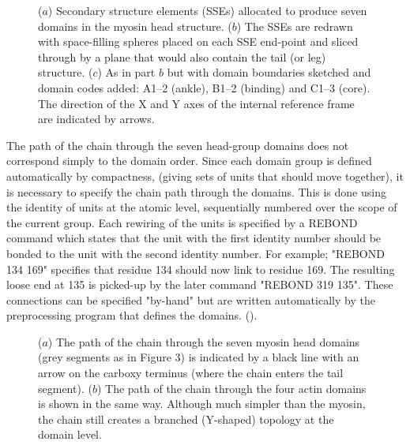 \begin{figure}
\centering
{}
\caption{
\label{Fig:secdoms}
($a$) Secondary structure elements (SSEs) allocated to produce seven domains
in the myosin head structure.
($b$) The SSEs are redrawn with space-filling
spheres placed on each SSE end-point and sliced through by a plane that would also 
contain the tail (or leg) structure.
($c$) As in part $b$ but with domain boundaries sketched and domain codes added:
A1--2 (ankle), B1--2 (binding) and C1--3 (core).   The direction of the X and Y axes
of the internal reference frame are indicated by arrows.
}
\end{figure}

The path of the chain through the seven head-group domains does not correspond simply
to the domain order.  Since each domain group is defined automatically by compactness,
(giving sets of units that should move together), it is necessary to specify the 
chain path through the domains.  This is done using the identity of units
at the atomic level, sequentially numbered over the scope of the current group. 
Each rewiring of the units is specified by a REBOND command which states that the
unit with the first identity number should be bonded to the unit with the second 
identity number.  For example; "REBOND 134 169" specifies that residue 134 should
now link to residue 169.  The resulting loose end at 135 is picked-up by the later
command "REBOND 319 135".   These connections can be specified "by-hand" but are
written automatically by the preprocessing program that defines the domains.
().

\begin{figure}
\centering
{}
\caption{
\label{Fig:domstrace}
($a$) The path of the chain through the seven myosin head domains (grey segments as
in Figure 3) is indicated by a black line with an arrow on the carboxy terminus 
(where the chain enters the tail segment).
($b$)  The path of the chain through the four actin domains is shown in the same way.
Although much simpler than the myosin, the chain still creates a branched (Y-shaped)
topology at the domain level.
}
\end{figure}


